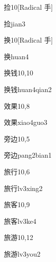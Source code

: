 \begin{entry}{捡}{10}[Radical 手]
  \begin{phonetics}{捡}{jian3}
  \end{phonetics}
\end{entry}

\begin{entry}{换}{10}[Radical 手]
  \begin{phonetics}{换}{huan4}
  \end{phonetics}
\end{entry}

\begin{entry}{换钱}{10,10}
  \begin{phonetics}{换钱}{huan4qian2}
  \end{phonetics}
\end{entry}

\begin{entry}{效果}{10,8}
  \begin{phonetics}{效果}{xiao4guo3}
  \end{phonetics}
\end{entry}

\begin{entry}{旁边}{10,5}
  \begin{phonetics}{旁边}{pang2bian1}
  \end{phonetics}
\end{entry}

\begin{entry}{旅行}{10,6}
  \begin{phonetics}{旅行}{lv3xing2}
  \end{phonetics}
\end{entry}

\begin{entry}{旅客}{10,9}
  \begin{phonetics}{旅客}{lv3ke4}
  \end{phonetics}
\end{entry}

\begin{entry}{旅游}{10,12}
  \begin{phonetics}{旅游}{lv3you2}
  \end{phonetics}
\end{entry}

